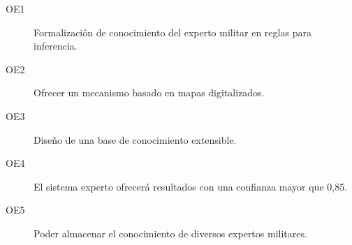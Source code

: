 \begin{description}
  \item[OE1] Formalización de conocimiento del experto militar en reglas para inferencia.
  \item[OE2] Ofrecer un mecanismo basado en mapas digitalizados.
  \item[OE3] Diseño de una base de conocimiento extensible.
  \item[OE4] El sistema experto ofrecerá resultados con una confianza mayor que 0,85.
  \item[OE5] Poder almacenar el conocimiento de diversos expertos militares.
\end{description}


